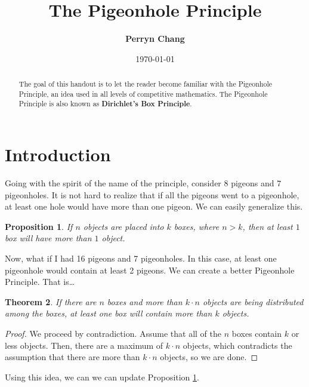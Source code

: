 \documentclass[l1pt]{article}
\title{\textbf{The Pigeonhole Principle}}
\author{\textbf{Perryn Chang}}
\date{\today}
\theoremstyle{plain}
\newtheorem{thm}{Theorem}[section]
\newtheorem{prop}[thm]{Proposition}
\theoremstyle{definition}
\theoremstyle{remark}
\begin{document}
\maketitle

\begin{abstract}
The goal of this handout is to let the reader become familiar with the Pigeonhole Principle, an idea used in all levels of competitive mathematics. The Pigeonhole Principle is also known as \textbf{Dirichlet's Box Principle}.
\end{abstract}

\tableofcontents

\eject

\section{Introduction}
Going with the spirit of the name of the principle, consider $8$ pigeons and $7$ pigeonholes. It is not hard to realize that if all the pigeons went to a pigeonhole, at least one hole would have more than one pigeon. We can easily generalize this.

\begin{mdframed}
    \begin{prop}
    \label{prop:beginintro}
    If $n$ objects are placed into $k$ boxes, where $n>k$, then at least $1$ box will have more than $1$ object.
    \end{prop}
\end{mdframed}

Now, what if I had 16 pigeons and 7 pigeonholes. In this case, at least one pigeonhole would contain at least 2 pigeons. We can create a better Pigeonhole Principle. That is\dots 


\begin{mdframed}
\begin{thm}
If there are $n$ boxes and more than $k\cdot n$ objects are being distributed among the boxes, at least one box will contain more than $k$ objects.
\end{thm}
\end{mdframed}

\begin{proof}
We proceed by contradiction. Assume that all of the $n$ boxes contain $k$ or less objects. Then, there are a maximum of $k\cdot n$ objects, which contradicts the assumption that there are more than $k\cdot n$ objects, so we are done.
\end{proof}


Using this idea, we can we can update Proposition \ref{prop:beginintro}.
\end{document}
